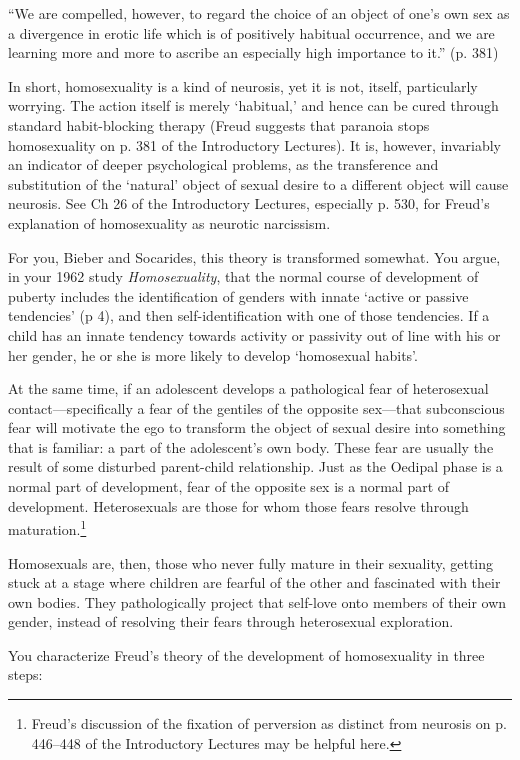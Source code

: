 \begin{refsection}
“We are compelled, however, to regard the choice of an object of one's own sex as a divergence in erotic life which is of positively habitual occurrence, and we are learning more and more to ascribe an especially high importance to it.” (p. 381)

In short, homosexuality is a kind of neurosis, yet it is not, itself, particularly worrying. The action itself is merely `habitual,' and hence can be cured through standard habit-blocking therapy (Freud suggests that paranoia stops homosexuality on p. 381 of the Introductory Lectures). It is, however, invariably an indicator of deeper psychological problems, as the transference and substitution of the `natural' object of sexual desire to a different object will cause neurosis. See Ch 26 of the Introductory Lectures, especially p. 530, for Freud's explanation of homosexuality as neurotic narcissism.

For you, Bieber and Socarides, this theory is transformed somewhat. You argue, in your 1962 study \emph{Homosexuality}, that the normal course of development of puberty includes the identification of genders with innate `active or passive tendencies' (p 4), and then self-identification with one of those tendencies. If a child has an innate tendency towards activity or passivity out of line with his or her gender, he or she is more likely to develop `homosexual habits'.

At the same time, if an adolescent develops a pathological fear of heterosexual contact—specifically a fear of the gentiles of the opposite sex—that subconscious fear will motivate the ego to transform the object of sexual desire into something that is familiar: a part of the adolescent's own body. These fear are usually the result of some disturbed parent-child relationship. Just as the Oedipal phase is a normal part of development, fear of the opposite sex is a normal part of development. Heterosexuals are those for whom those fears resolve through maturation.\footnote{Freud's discussion of the fixation of perversion as distinct from neurosis on p. 446--448 of the Introductory Lectures may be helpful here.}

Homosexuals are, then, those who never fully mature in their sexuality, getting stuck at a stage where children are fearful of the other and fascinated with their own bodies. They pathologically project that self-love onto members of their own gender, instead of resolving their fears through heterosexual exploration.

You characterize Freud's theory of the development of homosexuality in three steps:


\end{refsection}
